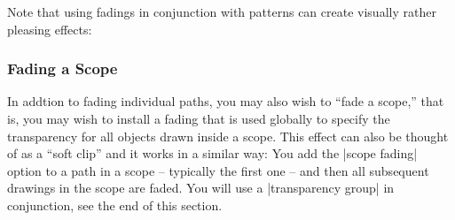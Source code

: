 Note that using fadings in conjunction with patterns can create
visually rather pleasing effects:
\begin{codeexample}[]
\tikzfading[name=middle,
            top color=transparent!50,
            bottom color=transparent!50,
            middle color=transparent!20]
\end{codeexample}


\subsubsection{Fading a Scope}

In addtion to fading individual paths, you may also wish to ``fade a
scope,'' that is, you may wish to install a fading that is used
globally to specify the transparency for all objects drawn inside a
scope. This effect can also be thought of as a ``soft clip'' and it
works in a similar way: You add the |scope fading| option to a path in
a scope -- typically the first one -- and then all subsequent drawings
in the scope are faded. You will use a |transparency group| in
conjunction, see the end of this section.

